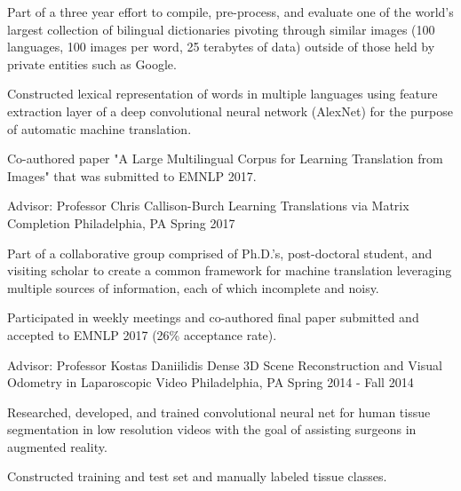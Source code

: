 \begin{cventries}
{\begin{cvitems}
        \item {Part of a three year effort to compile, pre-process, and evaluate one of the world’s largest collection of bilingual dictionaries pivoting through similar images (100 languages, 100 images per word, 25 terabytes of data) outside of those held by private entities such as Google.}
        \item {Constructed lexical representation of words in multiple languages using feature extraction layer of a deep convolutional neural network (AlexNet) for the purpose of automatic machine translation.}
        \item {Co-authored paper "A Large Multilingual Corpus for Learning Translation from Images" that was submitted to EMNLP 2017.}
      \end{cvitems} 
    }
  \cventry
    {Advisor: Professor Chris Callison-Burch}
      {Learning Translations via Matrix Completion}
    {Philadelphia, PA}
    {Spring 2017}
    {
      \begin{cvitems}
         \item {Part of a collaborative group comprised of Ph.D.’s, post-doctoral student, and visiting scholar to create a common framework for machine translation leveraging multiple sources of information, each of which incomplete and noisy.}
        \item {Participated in weekly meetings and co-authored final paper submitted and accepted to EMNLP 2017 (26\% acceptance rate).}
      \end{cvitems}
    }
  \cventry
    {Advisor: Professor Kostas Daniilidis}
    {Dense 3D Scene Reconstruction and Visual Odometry in Laparoscopic Video}
    {Philadelphia, PA}
    {Spring 2014 - Fall 2014}
    {
      \begin{cvitems}
        \item {Researched, developed, and trained convolutional neural net for human tissue segmentation in low resolution videos with the goal of assisting surgeons in augmented reality.}
        \item {Constructed training and test set and manually labeled tissue classes.}
      \end{cvitems}
    }
\end{cventries}
